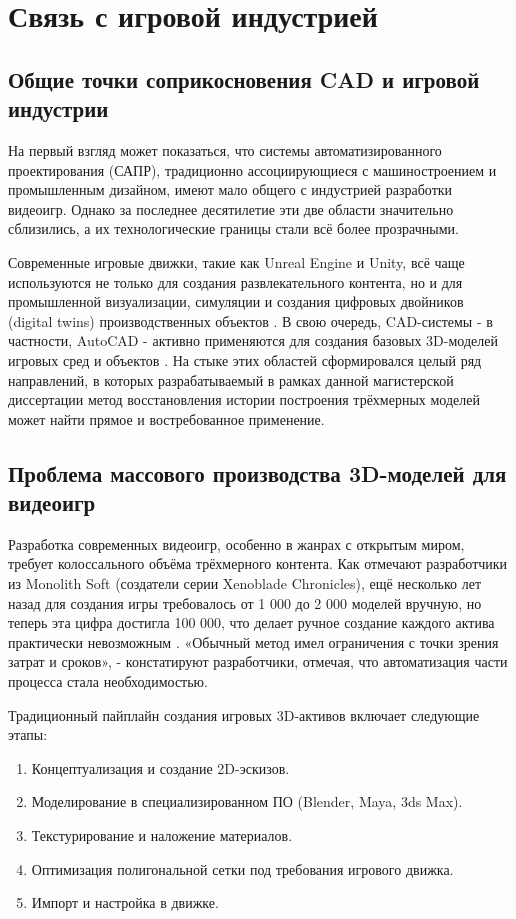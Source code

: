 
\section{Связь с игровой индустрией}

\subsection{Общие точки соприкосновения CAD и игровой индустрии}

На первый взгляд может показаться, что системы автоматизированного проектирования (САПР), традиционно ассоциирующиеся с машиностроением и промышленным дизайном, имеют мало общего с индустрией разработки видеоигр. Однако за последнее десятилетие эти две области значительно сблизились, а их технологические границы стали всё более прозрачными.

Современные игровые движки, такие как Unreal Engine и Unity, всё чаще используются не только для создания развлекательного контента, но и для промышленной визуализации, симуляции и создания цифровых двойников (digital twins) производственных объектов \cite{sastwin2025}. В свою очередь, CAD-системы - в частности, AutoCAD - активно применяются для создания базовых 3D-моделей игровых сред и объектов \cite{autodeskgaming2017}. На стыке этих областей сформировался целый ряд направлений, в которых разрабатываемый в рамках данной магистерской диссертации метод восстановления истории построения трёхмерных моделей может найти прямое и востребованное применение.

\subsection{Проблема массового производства 3D-моделей для видеоигр}

Разработка современных видеоигр, особенно в жанрах с открытым миром, требует колоссального объёма трёхмерного контента. Как отмечают разработчики из Monolith Soft (создатели серии Xenoblade Chronicles), ещё несколько лет назад для создания игры требовалось от 1 000 до 2 000 моделей вручную, но теперь эта цифра достигла 100 000, что делает ручное создание каждого актива практически невозможным \cite{assetgeneration2025}. «Обычный метод имел ограничения с точки зрения затрат и сроков», - констатируют разработчики, отмечая, что автоматизация части процесса стала необходимостью.

Традиционный пайплайн создания игровых 3D-активов включает следующие этапы:
\begin{enumerate}
    \item Концептуализация и создание 2D-эскизов.
    \item Моделирование в специализированном ПО (Blender, Maya, 3ds Max).
    \item Текстурирование и наложение материалов.
    \item Оптимизация полигональной сетки под требования игрового движка.
    \item Импорт и настройка в движке.
\end{enumerate}

